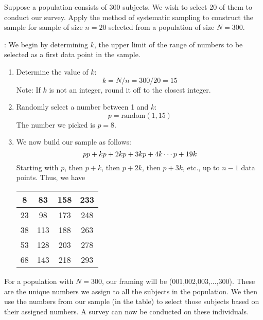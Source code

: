 \begin{example}  \label{sys-sampling-001}
Suppose a population consists of 300 subjects. We wish to select 20 of them to conduct our survey. Apply the method of systematic sampling to construct the sample for sample of size $n = 20$ selected from a population of size $N=300$. 

: We begin by determining $k$, the upper limit of the range of numbers to be selected as a first data point in the sample.  
\begin{enumerate}
\item Determine the value of $k$:
\[ k = N/n = 300/20 = 15 \]  
Note: If $k$ is not an integer, round it off to the closest integer. 
\item Randomly select a number between 1 and $k$:
\[ p = {\text{random}}(1,15) \]
The number we picked is $p=8$. 
\item We now build our sample as follows: 
\[ 
p \\
p + k \\
p + 2k \\
p + 3k \\
p + 4k \\
\cdots \\
p + 19k 
\]
Starting with $p$, then $p+k$, then $p + 2k$, then $p+3k$, etc., up to $n - 1$ data points. Thus, we have 
\begin{table}[h]
\begin{center}
\begin{tabular}{|c|c|c|c|}
\hline
8 & 83 & 158 & 233 \\
\hline
23 & 98 & 173 & 248 \\
\hline
38 & 113 & 188 & 263 \\
\hline
53 & 128 & 203 & 278  \\
\hline
68 & 143 & 218 & 293 \\
\hline
\end{tabular}
\end{center}
\end{table}
\end{enumerate}
For a population with $N=300$, our framing will be (001,002,003,...,300). These are the unique numbers we assign to all the subjects in the population. We then use the numbers from our sample (in the table) to select those subjects based on their assigned numbers. A survey can now be conducted on these individuals.    
\end{example}  

